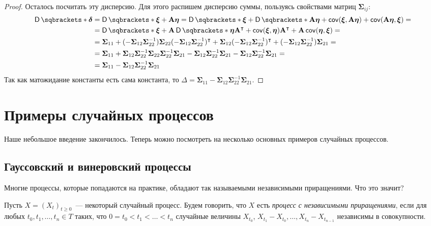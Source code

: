 \begin{proof}
	Осталось посчитать эту дисперсию. Для этого распишем дисперсию суммы, 
	пользуясь свойствами матриц \(\bm{\Sigma}_{ij}\):
	\begin{align*}
		\D{\bm{\delta}} &= \D{\bm{\xi} + \mathbf{A}\bm{\eta}} = \D{\bm{\xi}} + 
		\D{\mathbf{A}\bm{\eta}} + \cov(\bm{\xi}, \mathbf{A}\bm{\eta}) + 
		\cov(\mathbf{A}\bm{\eta}, \bm{\xi}) = \\
		&= \D{\bm{\xi}} + \mathbf{A}\D{\bm{\eta}}\mathbf{A}^{\intercal} + 
		\cov(\bm{\xi}, \bm{\eta})\mathbf{A}^{\intercal} + 
		\mathbf{A}\cov(\bm{\eta}, \bm{\xi}) = \\
		&= \bm{\Sigma}_{11} + (-\bm{\Sigma}_{12}\bm{\Sigma}_{22}^{-1}) 
		\bm{\Sigma}_{22}(-\bm{\Sigma}_{12}\bm{\Sigma}_{22}^{-1})^{\intercal} + 
		\bm{\Sigma}_{12}(-\bm{\Sigma}_{12}\bm{\Sigma}_{22}^{-1})^{\intercal} + 
		(-\bm{\Sigma}_{12}\bm{\Sigma}_{22}^{-1})\bm{\Sigma}_{21} = \\
		&= \bm{\Sigma}_{11} + \bm{\Sigma}_{12}\bm{\Sigma}_{22}^{-1}
		\bm{\Sigma}_{22} \bm{\Sigma}_{22}^{-1}\bm{\Sigma}_{21} - 
		\bm{\Sigma}_{12}\bm{\Sigma}_{22}^{-1}\bm{\Sigma}_{21} - 
		\bm{\Sigma}_{12}\bm{\Sigma}_{22}^{-1}\bm{\Sigma}_{21} = \\
		&= \bm{\Sigma}_{11} - 
		\bm{\Sigma}_{12}\bm{\Sigma}_{22}^{-1}\bm{\Sigma}_{21}
	\end{align*}
	Так как матожидание константы есть сама константа, то \(\Delta = 
	\bm{\Sigma}_{11} - \bm{\Sigma}_{12}\bm{\Sigma}_{22}^{-1}\bm{\Sigma}_{21}\).
\end{proof}

\section{Примеры случайных процессов}
Наше небольшое введение закончилось. Теперь можно посмотреть на несколько 
основных примеров случайных процессов.
\subsection{Гауссовский и винеровский процессы}
Многие процессы, которые попадаются на практике, обладают так называемыми 
независимыми приращениями. Что это значит?
\begin{definition}
	Пусть \(X = (X_{t})_{t \geq 0}\)~--- некоторый случайный процесс. Будем 
	говорить, что \(X\) есть \emph{процесс с независимыми приращениями}, если 
	для любых \(t_{0}, t_{1}, \dots, t_{n} \in T\) таких, что \(0 = t_{0} < 
	t_{1} < \ldots < t_{n}\) случайные величины \(X_{t_{0}}\), \(X_{t_{1}} - 
	X_{t_{0}}, \dots, X_{t_{n}} - X_{t_{n - 1}}\) независимы в 
	совокупности.
\end{definition}

